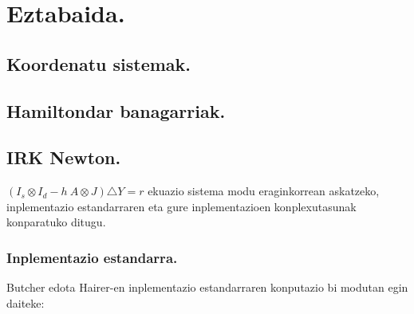 \chapter{Eztabaida.}

\section{Koordenatu sistemak.}

\section{Hamiltondar banagarriak.}

\section{IRK Newton.}

$(I_s \otimes I_d - h \ A \otimes J) \triangle Y = r$ ekuazio sistema modu eraginkorrean askatzeko, inplementazio estandarraren eta gure inplementazioen konplexutasunak konparatuko ditugu.

\subsection*{Inplementazio estandarra.}

Butcher edota Hairer-en inplementazio estandarraren konputazio bi modutan egin daiteke:

